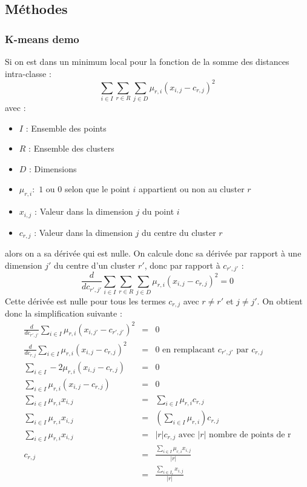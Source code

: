 \subsection{Méthodes}
\subsubsection{K-means demo}
\label{kmeans} 
Si on est dans un minimum local pour la fonction de la somme des distances intra-classe :
\[ \sum_{i\in I} \sum_{r\in R} \sum_{j\in D}\mu_{r,i} (x_{i,j}-c_{r,j})^2\]
avec :
\begin{itemize}
    \item $I$ : Ensemble des points
    \item $R$ : Ensemble des clusters
    \item $D$ : Dimensions
    \item $\mu_{r,i} :$ $1$ ou $0$ selon que le point $i$ appartient ou non au cluster $r$
    \item $x_{i,j}$ : Valeur dans la dimension $j$ du point $i$
    \item $c_{r,j}$ : Valeur dans la dimension $j$ du centre du cluster $r$
\end{itemize}
alors on a sa dérivée qui est nulle. On calcule donc sa dérivée par rapport à une dimension $j'$ du centre d'un cluster $r'$, donc par rapport à $c_{r',j'}$ :
\[
    \frac{d}{dc_{r',j'}}\sum_{i\in I} \sum_{r\in R} \sum_{j\in D}\mu_{r,i} (x_{i,j}-c_{r,j})^2 = 0
\]
Cette dérivée est nulle pour tous les termes $c_{r,j}$ avec $r\neq r'$ et $j\neq j'$. On obtient donc la simplification suivante :
\begin{eqnarray*}
    \frac{d}{dc_{r',j'}}\sum_{i\in I} \mu_{r,i} (x_{i,j'}-c_{r',j'})^2 &=& 0\\
    \frac{d}{dc_{r,j}}\sum_{i\in I} \mu_{r,i} (x_{i,j}-c_{r,j})^2 &=& 0  \text{ en remplacant $c_{r',j'}$ par $c_{r,j}$}\\
    \sum_{i\in I}-2\mu_{r,i}(x_{i,j}-c_{r,j}) &=& 0\\
    \sum_{i\in I}\mu_{r,i}(x_{i,j}-c_{r,j}) &=& 0\\
    \sum_{i\in I}\mu_{r,i}x_{i,j} &=& \sum_{i\in I}\mu_{r,i}c_{r,j}\\
    \sum_{i\in I}\mu_{r,i}x_{i,j} &=& (\sum_{i\in I}\mu_{r,i})c_{r,j}\\
    \sum_{i\in I}\mu_{r,i}x_{i,j} &=& |r|c_{r,j} \text{ avec $|r|$ nombre de points de r}\\
    c_{r,j} &=& \frac{\sum_{i\in I}\mu_{r,i}x_{i,j}}{|r|}\\
    &=& \frac{\sum_{i\in I_r}x_{i,j}}{|r|}
\end{eqnarray*}

